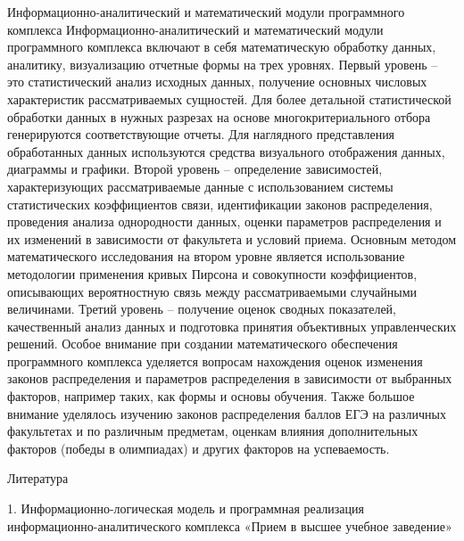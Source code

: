 \documentclass[12pt]{article}
\begin{document}
Информационно-аналитический и математический модули программного комплекса
Информационно-аналитический и математический модули программного комплекса включают в себя математическую обработку данных, аналитику, визуализацию отчетные формы на трех уровнях. Первый уровень – это статистический анализ  исходных данных, получение основных числовых характеристик рассматриваемых сущностей.   Для более детальной статистической обработки данных в нужных разрезах на основе многокритериального отбора генерируются соответствующие отчеты. Для наглядного представления обработанных данных используются средства визуального отображения данных, диаграммы и графики.
Второй уровень – определение зависимостей, характеризующих   рассматриваемые данные с использованием системы статистических коэффициентов связи, идентификации законов распределения,  проведения анализа однородности данных, оценки параметров распределения и их изменений в зависимости от факультета и условий приема. Основным методом математического исследования на втором уровне является использование методологии применения кривых Пирсона и совокупности коэффициентов, описывающих  вероятностную связь между рассматриваемыми случайными величинами. 
Третий уровень – получение оценок сводных показателей, качественный анализ данных и подготовка принятия объективных управленческих решений.
Особое внимание при создании математического обеспечения программного комплекса уделяется вопросам нахождения оценок изменения законов распределения и параметров распределения в зависимости от выбранных факторов, например таких, как формы  и основы обучения. Также большое внимание уделялось изучению законов  распределения баллов ЕГЭ на различных факультетах и по различным предметам, оценкам влияния дополнительных факторов (победы в олимпиадах) и других факторов  на успеваемость.




Литература

1. Информационно-логическая модель и программная реализация  информационно-аналитического комплекса
 «Прием в высшее учебное заведение»
\end{document}
